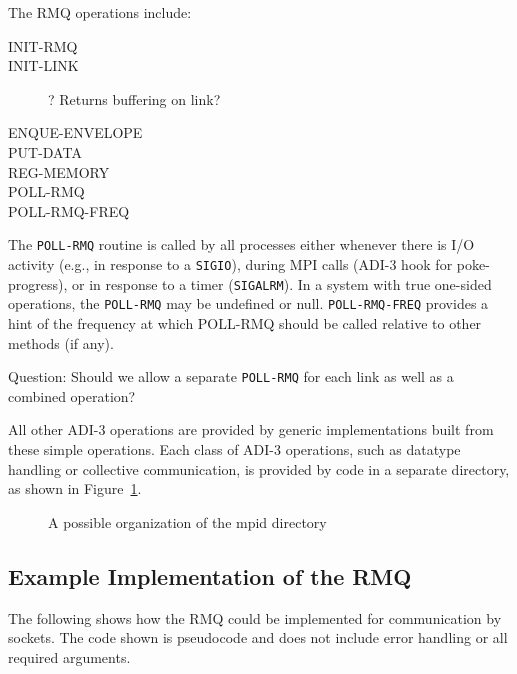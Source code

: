 \documentclass{article}
\let\code=\texttt
\begin{document}
The RMQ operations include:
\begin{description}
\item[INIT-RMQ]
\item[INIT-LINK]? Returns buffering on link?
\item[ENQUE-ENVELOPE]
\item[PUT-DATA]
\item[REG-MEMORY]
\item[POLL-RMQ]
\item[POLL-RMQ-FREQ]
\end{description}

The \code{POLL-RMQ} routine is called by all processes either whenever there
is I/O activity (e.g., in response to a \code{SIGIO}), during MPI calls (ADI-3
hook for poke-progress), or in response to a timer (\code{SIGALRM}).  In a
system with true one-sided operations, the \code{POLL-RMQ} may be undefined or
null.  \code{POLL-RMQ-FREQ} provides a hint of the frequency at which POLL-RMQ
should be called relative to other methods (if any).

Question: Should we allow a separate \code{POLL-RMQ} for each link as well as
a combined operation?

All other ADI-3 operations are provided by generic implementations built from
these simple operations.  Each class of ADI-3 operations, such as datatype
handling or collective communication, is provided by code in a separate
directory, as shown in Figure~\ref{fig:mpid-dirs}.

\begin{figure}
\centerline{}
\caption{A possible organization of the mpid directory}
\label{fig:mpid-dirs}
\end{figure}

\subsection{Example Implementation of the RMQ}
The following shows how the RMQ could be implemented for communication by
sockets.  The code shown is pseudocode and does not include error handling or
all required arguments.
\end{document}
